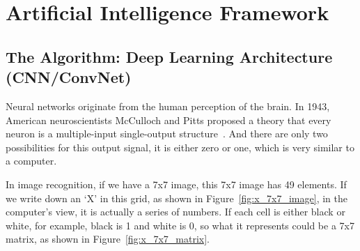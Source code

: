 \section{Artificial Intelligence Framework}
\label{sec:3.1}
\subsection{The Algorithm: Deep Learning Architecture (CNN/ConvNet)}

Neural networks originate from the human perception of the brain. In 1943, American neuroscientists McCulloch and Pitts proposed a theory that every neuron is a multiple-input single-output structure~\cite{mcculloch1943logical}. And there are only two possibilities for this output signal, it is either zero or one, which is very similar to a computer.

In image recognition, if we have a 7x7 image, this 7x7 image has 49 elements. If we write down an `X' in this grid, as shown in Figure~\ref{fig:x_7x7_image}, in the computer's view, it is actually a series of numbers. If each cell is either black or white, for example, black is 1 and white is 0, so what it represents could be a 7x7 matrix, as shown in Figure~\ref{fig:x_7x7_matrix}.


